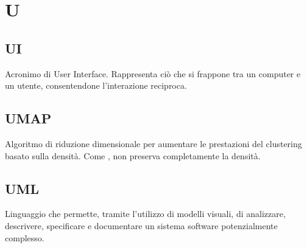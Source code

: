 \section*{U}
\markright{}

\subsection*{UI}
Acronimo di User Interface. Rappresenta ciò che si frappone tra un computer e un utente, consentendone l'interazione reciproca.

\subsection*{UMAP}
Algoritmo di riduzione dimensionale per aumentare le prestazioni del clustering basato sulla densità.
Come , non preserva completamente la densità.

\subsection*{UML}
Linguaggio che permette, tramite l'utilizzo di modelli visuali, di analizzare, descrivere, specificare e documentare un sistema software potenzialmente complesso.
